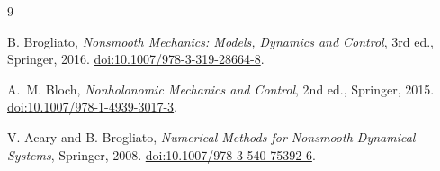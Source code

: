 \documentclass[11pt,a4paper]{article}
\theoremstyle{definition}
\theoremstyle{plain}
\theoremstyle{remark}
\begin{document}
\begingroup
\small
{}
\begin{thebibliography}{9}

B. Brogliato, \emph{Nonsmooth Mechanics: Models, Dynamics and
Control}, 3rd ed., Springer, 2016.
\href{https://doi.org/10.1007/978-3-319-28664-8}
{doi:10.1007/978-3-319-28664-8}.

A.~M. Bloch, \emph{Nonholonomic Mechanics and Control}, 2nd ed.,
Springer, 2015.
\href{https://doi.org/10.1007/978-1-4939-3017-3}
{doi:10.1007/978-1-4939-3017-3}.

V. Acary and B. Brogliato,
\emph{Numerical Methods for Nonsmooth Dynamical Systems},
Springer, 2008.
\href{https://doi.org/10.1007/978-3-540-75392-6}
{doi:10.1007/978-3-540-75392-6}.

\end{thebibliography}
\endgroup
\end{document}

